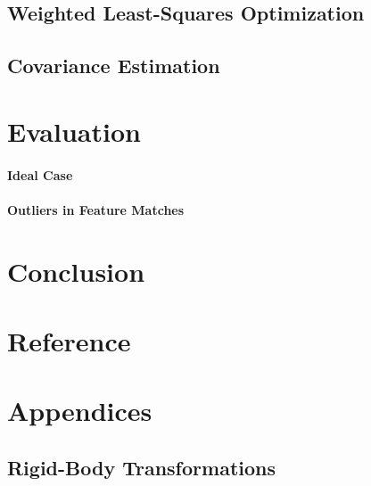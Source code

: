 \documentclass[a4paper]{report}
\numberwithin{figure}{section}
\begin{document}
\section{Weighted Least-Squares Optimization} \label{sc_weighted_lsq}

\section{Covariance Estimation} \label{sc_covariance_estim}

\chapter{Evaluation} \label{cp_evaluation}

\subsubsection{Ideal Case} \label{sb_sb_sc_ideal_case}

\subsubsection{Outliers in Feature Matches} \label{sb_sb_sc_outliers}


\chapter{Conclusion} \label{cp_conc}

\chapter{Reference} \label{cp_ref}


\chapter{Appendices} \label{cp_appendices}

\section{Rigid-Body Transformations} \label{sc_rigid_body_transformations}
\end{document}
